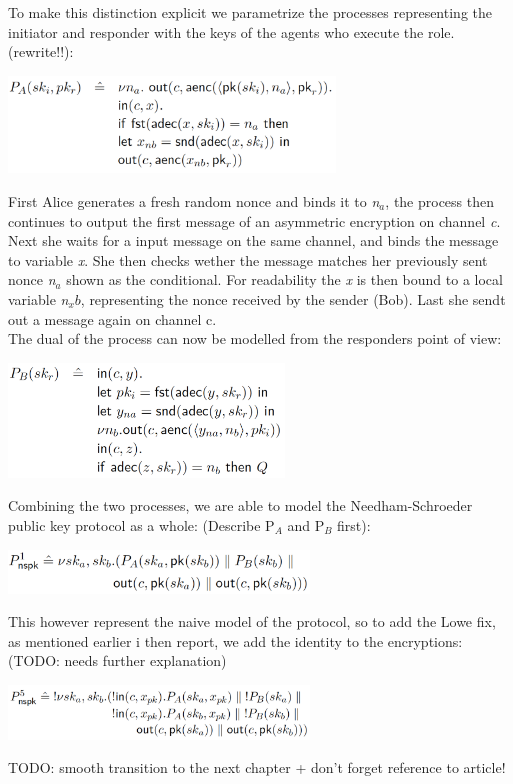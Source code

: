 To make this distinction explicit we parametrize the processes representing the initiator and responder with the keys of the agents who execute the role. (rewrite!!):
\begin{center}
\includegraphics[width=0.65\textwidth, angle=0]{Graphics/P_A.pdf}
\end{center}
First Alice generates a fresh random nonce and binds it to \textit{n$_a$}, the process then continues to output the first message of an asymmetric encryption on channel \textit{c}. Next she waits for a input message on the same channel, and binds the message to variable \textit{x}. She then checks wether the message matches her previously sent nonce \textit{n$_a$} shown as the conditional. For readability the \textit{x} is then bound to a local variable \textit{n$_xb$}, representing the nonce received by the sender (Bob). Last she sendt out a message again on channel c. \\

\noindent The dual of the process can now be modelled from the responders point of view:
\begin{center}
\includegraphics[width=0.55\textwidth, angle=0]{Graphics/P_B.pdf}
\end{center}

\noindent Combining the two processes, we are able to model the Needham-Schroeder public key protocol as a whole: 
\citeauthor{DBLP:journals/ftpl/CortierK14} (Describe P$_{A}$ and P$_{B}$ first):
\begin{center}
\includegraphics[width=0.6\textwidth, angle=0]{Graphics/P1_nspk.pdf}
\end{center}
This however represent the naive model of the protocol, so to add the Lowe fix, as mentioned earlier i then report, we add the identity to the encryptions: (TODO: needs further explanation)
\begin{center}
\includegraphics[width=0.6\textwidth, angle=0]{Graphics/P5_nspk.pdf}
\end{center}
TODO: smooth transition to the next chapter + don't forget reference to article!


